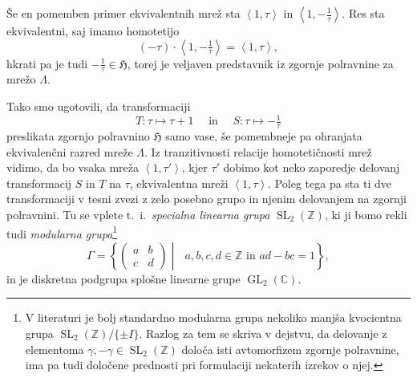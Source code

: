 \documentclass[mat1]{fmfdelo}
\numberwithin{equation}{section}
\newcommand{\Z}{\mathbb Z}
\newcommand{\C}{\mathbb C}
\newcommand{\HH}{\mathfrak{H}}
\newcommand{\SL}{\Gamma}
\newcommand{\pabcd}{\begin{pmatrix} a & b \\ c & d \end{pmatrix}}
\newcommand{\lattice}[2]{\left\langle #1, #2 \right\rangle}
\newcommand{\ti}{t.~i.\ }
\DeclareMathOperator{\GL}{GL}
\theoremstyle{definition}
\begin{document}
Še en pomemben primer ekvivalentnih mrež sta $\lattice{1}{\tau}$ in $\lattice{1}{-\frac{1}{\tau}}$. Res sta ekvivalentni, saj imamo homotetijo
\[
    (-\tau)\cdot\lattice{1}{-\tfrac1\tau} = \lattice{1}{\tau},
\] 
hkrati pa je tudi $-\frac{1}{\tau} \in \HH$, torej je veljaven predstavnik iz zgornje polravnine za mrežo $\Lambda$.

Tako smo ugotovili, da transformaciji
\[
    T:\tau \mapsto \tau + 1 \quad \text{ in } \quad S:\tau \mapsto -\tfrac1\tau
\]
preslikata zgornjo polravnino $\HH$ samo vase, še pomembneje pa ohranjata ekvivalenčni razred mreže $\Lambda$. Iz tranzitivnosti relacije homotetičnosti mrež vidimo, da bo vsaka mreža $\lattice{1}{\tau'}$, kjer $\tau'$ dobimo kot neko zaporedje delovanj transformacij $S$ in $T$ na $\tau$, ekvivalentna mreži $\lattice{1}{\tau}$.
Poleg tega pa sta ti dve transformaciji v tesni zvezi z zelo posebno grupo in njenim delovanjem na zgornji polravnini.
Tu se vplete \ti \emph{specialna linearna grupa} $\operatorname{SL}_2(\Z)$, ki ji bomo rekli tudi \emph{modularna grupa}\footnote{V literaturi je bolj standardno modularna grupa nekoliko manjša kvocientna grupa $\operatorname{SL}_2(\Z)/\{\pm I\}$. Razlog za tem se skriva v dejstvu, da delovanje z elementoma $\gamma, -\gamma \in \operatorname{SL}_2(\Z)$ določa isti avtomorfizem zgornje polravnine, ima pa  tudi določene prednosti pri formulaciji nekaterih izrekov o njej. 
}
\[
    \SL = \left\{\pabcd \middle\vert \text{ } a,b,c,d \in \Z \text{ in } ad - bc = 1\right\},
\]
in je diskretna podgrupa splošne linearne grupe $\GL_2(\C)$. 
\end{document}
